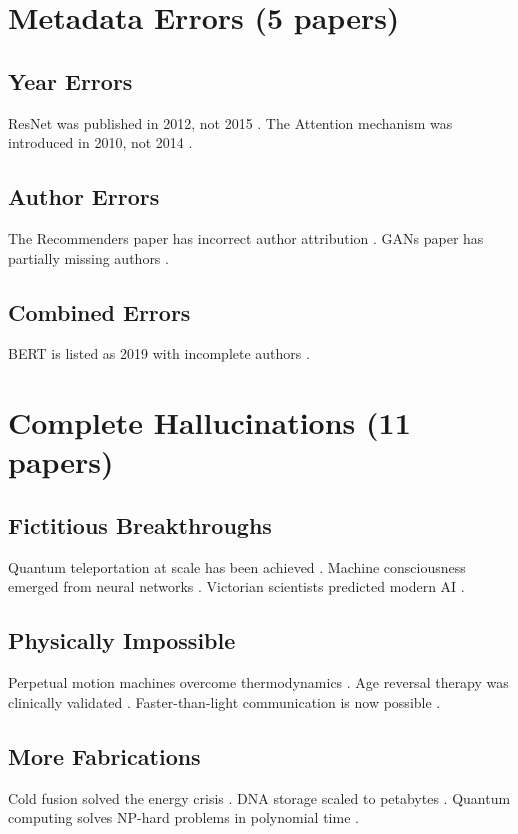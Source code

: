 \documentclass{article}
\begin{document}
\section{Metadata Errors (5 papers)}

\subsection{Year Errors}
ResNet was published in 2012, not 2015 \cite{He2012Wrong}. The Attention mechanism was introduced in 2010, not 2014 \cite{Bahdanau2010Wrong}.

\subsection{Author Errors}
The Recommenders paper has incorrect author attribution \cite{RecommendersWrong}. GANs paper has partially missing authors \cite{GoodfellowIncomplete}.

\subsection{Combined Errors}
BERT is listed as 2019 with incomplete authors \cite{DevlinWrong}.

\section{Complete Hallucinations (11 papers)}

\subsection{Fictitious Breakthroughs}
Quantum teleportation at scale has been achieved \cite{Smith2024Quantum}. Machine consciousness emerged from neural networks \cite{Johnson2023Consciousness}. Victorian scientists predicted modern AI \cite{Newton1850Victorian}.

\subsection{Physically Impossible}
Perpetual motion machines overcome thermodynamics \cite{Thompson2024Perpetual}. Age reversal therapy was clinically validated \cite{Goldman2023Aging}. Faster-than-light communication is now possible \cite{Williams2024FTL}.

\subsection{More Fabrications}
Cold fusion solved the energy crisis \cite{Brown2023ColdFusion}. DNA storage scaled to petabytes \cite{Johnson2023DNA}. Quantum computing solves NP-hard problems in polynomial time \cite{Quantum2024NP}.
\end{document}
